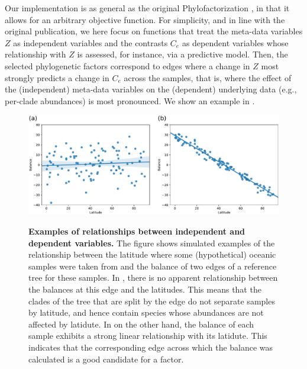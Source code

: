 Our implementation is as general as the original Phylofactorization \cite{Washburne2017a},
in that it allows for an arbitrary objective function.
For simplicity, and in line with the original publication,
we here focus on functions that treat the meta-data variables $Z$ as independent variables
and the contrasts $C_e$ as dependent variables whose relationship with $Z$ is assessed, for instance, via a predictive model.
Then, the selected phylogenetic factors correspond to edges
where a change in $Z$ most strongly predicts a change in $C_e$ across the samples,
that is, where the effect of the (independent) meta-data variables
on the (dependent) underlying data (e.g., per-clade abundances) is most pronounced.
We show an example in .

\begin{figure}[!htbp]
    \centering
    \includegraphics[width=\linewidth]{pdf/balance_factors.pdf}
    \begin{subfigure}{0pt}
        \label{fig:balance_factors:sub:bad}
    \end{subfigure}
    \begin{subfigure}{0pt}
        \label{fig:balance_factors:sub:good}
    \end{subfigure}
    \caption[Examples of relationships between independent and dependent variables]{
        \textbf{Examples of relationships between independent and dependent variables.}
        The figure shows simulated examples of the relationship between the latitude
        where some (hypothetical) oceanic samples were taken from
        and the balance of two edges of a reference tree for these samples.
        In , there is no apparent relationship
        between the balances at this edge and the latitudes.
        This means that the clades of the tree that are split by the edge do not separate samples by latitude,
        and hence contain species whose abundances are not affected by latidute.
        In  on the other hand, the balance of each sample
        exhibits a strong linear relationship with its latidute.
        This indicates that the corresponding edge across which the balance was calculated
        is a good candidate for a factor.
    }
    \label{fig:balance_factors}
\end{figure}

